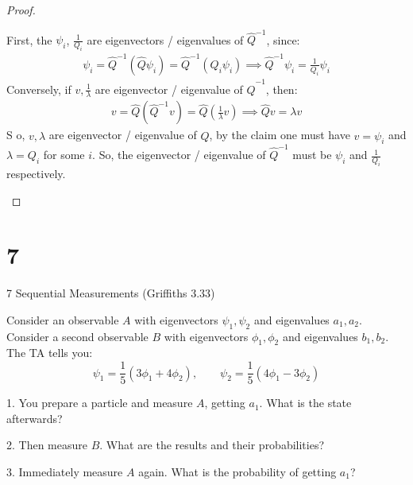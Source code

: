 \documentclass{article}
\begin{document}
\begin{proof}
\begin{enumerate}
        First, the $\psi_i$, $\frac{1}{Q_i}$ are eigenvectors / eigenvalues of $\hat{Q}^{-1}$, since:
        \begin{align}
            \psi_i=\hat{Q}^{-1}(\hat{Q}\psi_i) = \hat{Q}^{-1}(Q_i\psi_i)\implies \hat{Q}^{-1}\psi_i = \frac{1}{Q_i}\psi_i
        \end{align}
        Conversely, if $v, \frac{1}{\lambda}$ are eigenvector / eigenvalue of $\hat{Q}^{-1}$, then:
        \begin{align}
            v = \hat{Q}(\hat{Q}^{-1}v) = \hat{Q}\left(\frac{1}{\lambda} v\right)\implies \hat{Q}v = \lambda v
        \end{align}S
        o, $v,\lambda$ are eigenvector / eigenvalue of $\hat{Q}$, by the claim one must have $v=\psi_i$ and $\lambda=Q_i$ for some $i$. So, the eigenvector / eigenvalue of $\hat{Q}^{-1}$ must be $\psi_i$ and $\frac{1}{Q_i}$ respectively.

    \end{enumerate}
\end{proof}

\newpage

\section*{7}
\begin{ques}\label{q7}
7 Sequential Measurements (Griffiths 3.33)

Consider an observable $A$ with eigenvectors $\psi_1,\psi_2$ and eigenvalues $a_1,a_2$. Consider a second observable $B$ with eigenvectors $\phi_1,\phi_2$ and eigenvalues $b_1,b_2$. The TA tells you:
\[
\psi_1 = \frac{1}{5}(3\phi_1 + 4\phi_2), \qquad
\psi_2 = \frac{1}{5}(4\phi_1 - 3\phi_2)
\]

1. You prepare a particle and measure $A$, getting $a_1$. What is the state afterwards?

2. Then measure $B$. What are the results and their probabilities?

3. Immediately measure $A$ again. What is the probability of getting $a_1$?
\end{ques}
\end{document}
